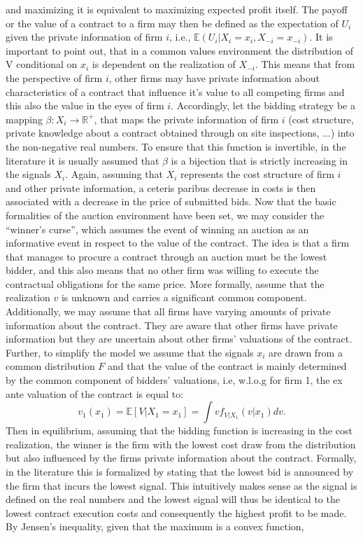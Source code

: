 \documentclass[a4paper,12pt, headsepline]{scrartcl}
\numberwithin{equation}{section}
\begin{document}
and maximizing it is equivalent to maximizing expected profit itself. The payoff or the value of a contract to a firm may then be defined as the expectation of $U_i$ given the private information of firm $i$, i.e., $\mathbb{E}(U_i|X_i = x_i, X_{-i} = x_{-i})$. It is important to point out, that in a common values environment the distribution of V conditional on $x_{i}$ is dependent on the realization of $X_{-i}$. This means that from the perspective of firm $i$, other firms may have private information about characteristics of a contract that influence it's value to all competing firms and this also the value in the eyes of firm $i$. Accordingly, let the bidding strategy be a mapping $\beta: X_i \rightarrow \mathbb{R}^+$, that maps the private information of firm $i$ (cost structure, private knowledge about a contract obtained through on site inspections, ...) into the non-negative real numbers. To ensure that this function is invertible, in the literature it is usually assumed that $\beta$ is a bijection that is strictly increasing in the signals $X_i$. Again, assuming that $X_i$ represents the cost structure of firm $i$ and other private information, a ceteris paribus decrease in costs is then associated with a decrease in the price of submitted bids. Now that the basic formalities of the auction environment have been set, we may consider the \enquote{winner's curse}, which assumes the event of winning an auction as an informative event in respect to the value of the contract. The idea is that a firm that manages to procure a contract through an auction must be the lowest bidder, and this also means that no other firm was willing to execute the contractual obligations for the same price. More formally, assume that the realization $v$ is unknown and carries a significant common component. Additionally, we may assume that all firms have varying amounts of private information about the contract. They are aware that other firms have private information but they are uncertain about other firms' valuations of the contract. Further, to simplify the model we assume that the signals $x_i$ are drawn from a common distribution $F$ and that the value of the contract is mainly determined by the common component of bidders' valuations, i.e, w.l.o.g for firm 1, the ex ante valuation of the contract is equal to:
\[
v_1(x_1) = \mathbb{E}[V|X_1 = x_1]  = \int vf_{V|X_1}(v|x_1)dv.
\]
 Then in equilibrium, assuming that the bidding function is increasing in the cost realization, the winner is the firm with the lowest cost draw from the distribution but also influenced by the firms private information about the contract. Formally, in the literature this is formalized by stating that the lowest bid is announced by the firm that incurs the lowest signal. This intuitively makes sense as the signal is defined on the real numbers and the lowest signal will thus be identical to the lowest contract execution costs and consequently the highest profit to be made. By Jensen's inequality, given that the maximum is a convex function, 
\end{document}
